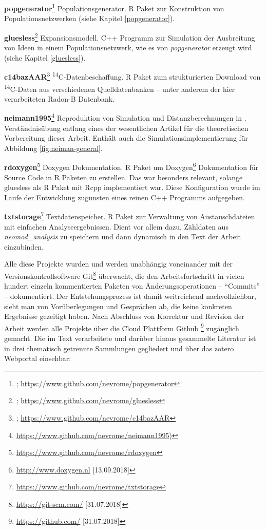 \documentclass[openany,twoside,twocolumn]{book}
\let\rmarkdownfootnote\footnote%
\def\footnote{\protect\rmarkdownfootnote}
\begin{document}
\textbf{popgenerator}\footnote{\textcite{schmid_popgenerator_2018};
  \url{https://www.github.com/nevrome/popgenerator}} \newline
Populationsgenerator. R Paket zur Konstruktion von Populationsnetzwerken
(siehe Kapitel \ref{popgenerator}).

\textbf{gluesless}\footnote{\textcite{clemens_schmid_gluesless_2018};
  \url{https://www.github.com/nevrome/gluesless}} \newline 
Expansionsmodell. C++ Programm zur Simulation der Ausbreitung von Ideen
in einem Populationsnetzwerk, wie es von \emph{popgenerator} erzeugt
wird (siehe Kapitel \ref{gluesless}).

\textbf{c14bazAAR}\footnote{\textcite{schmid_c14bazaar_2018};
  \url{https://www.github.com/nevrome/c14bazAAR}} \newline 
\textsuperscript{14}C-Datenbeschaffung. R Paket zum strukturierten
Download von \textsuperscript{14}C-Daten aus verschiedenen
Quelldatenbanken -- unter anderem der hier verarbeiteten Radon-B
Datenbank.

\textbf{neimann1995}\footnote{\url{https://www.github.com/nevrome/neimann1995})}
\newline  Reproduktion von Simulation und Distanzberechnungen in
\textcite{neiman_stylistic_1995}. Verständnisübung entlang eines der
wesentlichen Artikel für die theoretischen Vorbereitung dieser Arbeit.
Enthält auch die Simulationsimplementierung für Abbildung
\ref{fig:neiman-general}.

\textbf{rdoxygen}\footnote{\url{https://www.github.com/nevrome/rdoxygen}}
\newline  Doxygen Dokumentation. R Paket um Doxygen\footnote{\url{http://www.doxygen.nl}
  {[}13.09.2018{]}} Dokumentation für Source Code in R Paketen zu
erstellen. Das war besonders relevant, solange gluesless als R Paket mit
Rcpp implementiert war. Diese Konfiguration wurde im Laufe der
Entwicklung zugunsten eines reinen C++ Programms aufgegeben.

\textbf{txtstorage}\footnote{\url{https://www.github.com/nevrome/txtstorage}}
\newline  Textdatenspeicher. R Paket zur Verwaltung von Austauschdateien
mit einfachen Analyseergebnissen. Dient vor allem dazu, Zähldaten aus
\emph{neomod\_analysis} zu speichern und dann dynamisch in den Text der
Arbeit einzubinden.

Alle diese Projekte wurden und werden unabhängig voneinander mit der
Versionskontrollsoftware Git\footnote{\url{https://git-scm.com/}
  {[}31.07.2018{]}} überwacht, die den Arbeitsfortschritt in vielen
hundert einzeln kommentierten Paketen von Änderungsoperationen --
``Commits'' -- dokumentiert. Der Entstehungsprozess ist damit
weitreichend nachvollziehbar, sieht man von Vorüberlegungen und
Gesprächen ab, die keine konkreten Ergebnisse gezeitigt haben. Nach
Abschluss von Korrektur und Revision der Arbeit werden alle Projekte
über die Cloud Plattform Github \footnote{\url{https://github.com/}
  {[}31.07.2018{]}} zugänglich gemacht. Die im Text verarbeitete und
darüber hinaus gesammelte Literatur ist in drei thematisch getrennte
Sammlungen gegliedert und über das zotero Webportal einsehbar:
\end{document}
